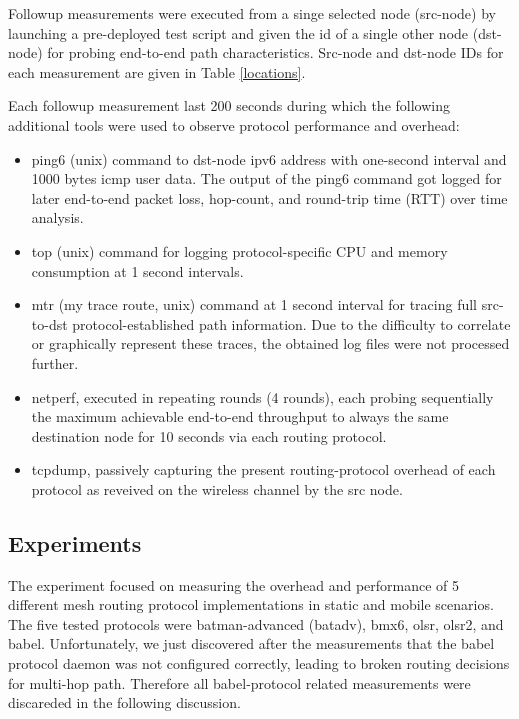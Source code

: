 \documentclass[a4paper,12pt,twoside]{article}
\begin{document}
Followup measurements were executed from a singe selected node
(src-node) by launching a pre-deployed test script \cite{wbm-test} and
given the id of a single other node (dst-node) for probing end-to-end
path characteristics. Src-node and dst-node IDs for each measurement
are given in Table \ref{locations}.

Each followup measurement last 200 seconds during which the following
additional tools were used to observe protocol performance and
overhead: 
\begin{itemize}
\item ping6 (unix) command to dst-node ipv6 address with one-second interval
  and 1000 bytes icmp user data. The output of the ping6 command got
  logged for later end-to-end packet loss, hop-count, and round-trip
  time (RTT) over time analysis.

\item top (unix) command for logging protocol-specific CPU and memory
  consumption at 1 second intervals.

\item mtr (my trace route, unix) command at 1 second interval for
  tracing full src-to-dst protocol-established path information. Due
  to the difficulty to correlate or graphically represent these traces,
  the obtained log files were not processed further.

\item netperf, executed in repeating rounds (4 rounds), each probing
  sequentially the maximum achievable end-to-end throughput to always
  the same destination node for 10 seconds via each routing protocol.
  
\item tcpdump, passively capturing the present routing-protocol
  overhead of each protocol as reveived on the wireless channel by the
  src node.

\end{itemize}

\subsection{Experiments}

The experiment focused on measuring the overhead and performance of 5
different mesh routing protocol implementations in static and mobile
scenarios. The five tested protocols were batman-advanced (batadv),
bmx6, olsr, olsr2, and babel. Unfortunately, we just discovered after
the measurements that the babel protocol daemon was not configured
correctly, leading to broken routing decisions for multi-hop
path. Therefore all babel-protocol related measurements were discareded
in the following discussion.
\end{document}
